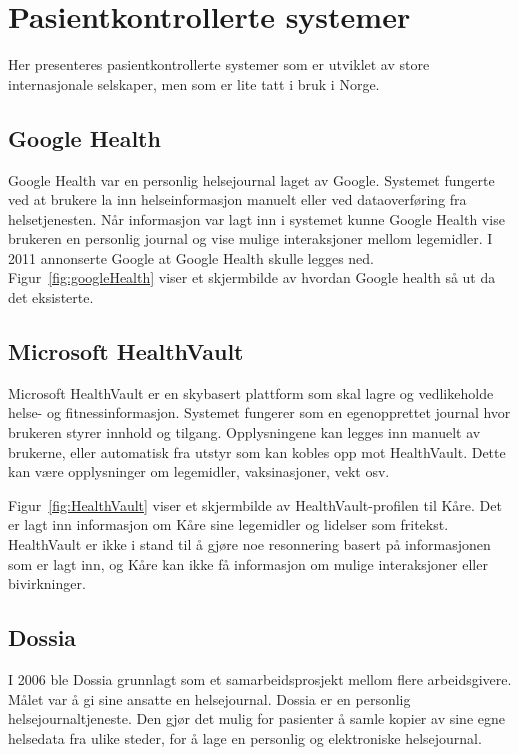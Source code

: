 \section{Pasientkontrollerte systemer}
Her presenteres pasientkontrollerte systemer som er utviklet av store internasjonale selskaper, men som er lite tatt i bruk i Norge. 

\subsection{Google Health}
Google Health var en personlig helsejournal laget av Google. Systemet fungerte ved at brukere la inn helseinformasjon manuelt eller ved dataoverføring fra helsetjenesten. Når informasjon var lagt inn i systemet kunne Google Health vise brukeren en personlig journal og vise mulige interaksjoner mellom legemidler. I 2011 annonserte Google at Google Health skulle legges ned. Figur~\ref{fig:googleHealth} viser et skjermbilde av hvordan Google health så ut da det eksisterte. 

\subsection{Microsoft HealthVault}
Microsoft HealthVault er en skybasert plattform som skal lagre og vedlikeholde helse- og fitnessinformasjon. Systemet fungerer som en egenopprettet journal hvor brukeren styrer innhold og tilgang. Opplysningene kan legges inn manuelt av brukerne, eller automatisk fra utstyr som kan kobles opp mot HealthVault. Dette kan være opplysninger om legemidler, vaksinasjoner, vekt osv. 

Figur~\ref{fig:HealthVault} viser et skjermbilde av HealthVault-profilen til Kåre. Det er lagt inn informasjon om Kåre sine legemidler og lidelser som fritekst. HealthVault er ikke i stand til å gjøre noe resonnering basert på informasjonen som er lagt inn, og Kåre kan ikke få informasjon om mulige interaksjoner eller bivirkninger. 


\subsection{Dossia}
I 2006 ble Dossia grunnlagt som et samarbeidsprosjekt mellom flere arbeidsgivere. Målet var å gi sine ansatte en helsejournal. Dossia er en personlig helsejournaltjeneste. Den gjør det mulig for pasienter å samle kopier av sine egne helsedata fra ulike steder, for å lage en personlig og elektroniske helsejournal.

